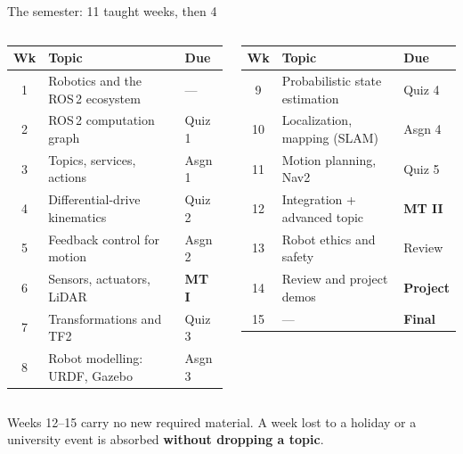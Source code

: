 \documentclass[aspectratio=169]{beamer}
\begin{document}
\begin{frame}{The semester: 11 taught weeks, then 4}
  \scriptsize
  \begin{columns}[T,onlytextwidth]
    \begin{tabular}{@{}clp{1.15cm}@{}}
      \toprule
      \textbf{Wk} & \textbf{Topic} & \textbf{Due} \\
      \midrule
      1  & Robotics and the ROS\,2 ecosystem & --- \\
      2  & ROS\,2 computation graph & Quiz 1 \\
      3  & Topics, services, actions & Asgn 1 \\
      4  & Differential-drive kinematics & Quiz 2 \\
      5  & Feedback control for motion & Asgn 2 \\
      6  & Sensors, actuators, LiDAR & \textbf{MT I} \\
      7  & Transformations and TF2 & Quiz 3 \\
      8  & Robot modelling: URDF, Gazebo & Asgn 3 \\
      \bottomrule
    \end{tabular}

    \begin{tabular}{@{}clp{1.15cm}@{}}
      \toprule
      \textbf{Wk} & \textbf{Topic} & \textbf{Due} \\
      \midrule
      9  & Probabilistic state estimation & Quiz 4 \\
      10 & Localization, mapping (SLAM) & Asgn 4 \\
      11 & Motion planning, Nav2 & Quiz 5 \\
      \midrule
      12 & Integration + advanced topic & \textbf{MT II} \\
      13 & Robot ethics and safety & Review \\
      14 & Review and project demos & \textbf{Project} \\
      15 & --- & \textbf{Final} \\
      \bottomrule
    \end{tabular}
  \end{columns}

  \vspace{0.7em}
  \normalsize
  Weeks 12--15 carry no new required material. A week lost to a holiday or a university event
  is absorbed \textbf{without dropping a topic}.
\end{frame}
\end{document}
